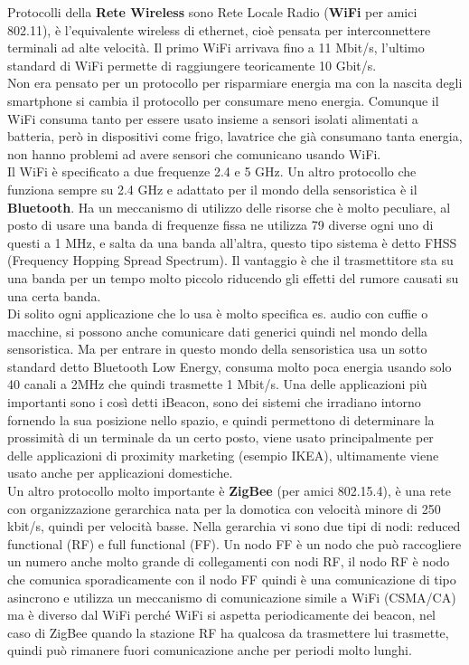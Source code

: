 \documentclass[11pt, twocolumn]{article}
\begin{document}
Protocolli della \textbf{Rete Wireless} sono Rete Locale Radio (\textbf{WiFi} per amici 802.11), è l'equivalente wireless di ethernet, cioè pensata per interconnettere terminali ad alte velocità.
Il primo WiFi arrivava fino a 11 Mbit/s, l'ultimo standard di WiFi permette di raggiungere teoricamente 10 Gbit/s.\\
Non era pensato per un protocollo per risparmiare energia ma con la nascita degli smartphone si cambia il protocollo per consumare meno energia.
Comunque il WiFi consuma tanto per essere usato insieme a sensori isolati alimentati a batteria, però in dispositivi come frigo, lavatrice che già consumano tanta energia, non hanno problemi ad avere sensori che comunicano usando WiFi.\\
Il WiFi è specificato a due frequenze 2.4 e 5 GHz.
Un altro protocollo che funziona sempre su 2.4 GHz e adattato per il mondo della sensoristica è il \textbf{Bluetooth}.
Ha un meccanismo di utilizzo delle risorse che è molto peculiare, al posto di usare una banda di frequenze fissa ne utilizza 79 diverse ogni uno di questi a 1 MHz, e salta da una banda all'altra, questo tipo sistema è detto FHSS (Frequency Hopping Spread Spectrum).
Il vantaggio è che il trasmettitore sta su una banda per un tempo molto piccolo riducendo gli effetti del rumore causati su una certa banda.\\
Di solito ogni applicazione che lo usa è molto specifica es. audio con cuffie o macchine, si possono anche comunicare dati generici quindi nel mondo della sensoristica.
Ma per entrare in questo mondo della sensoristica usa un sotto standard detto Bluetooth Low Energy, consuma molto poca energia usando solo 40 canali a 2MHz che quindi trasmette 1 Mbit/s.
Una delle applicazioni più importanti sono i così detti iBeacon, sono dei sistemi che irradiano intorno fornendo la sua posizione nello spazio, e quindi permettono di determinare la prossimità di un terminale da un certo posto, viene usato principalmente per delle applicazioni di proximity marketing (esempio IKEA), ultimamente viene usato anche per applicazioni domestiche.\\
Un altro protocollo molto importante è \textbf{ZigBee} (per amici 802.15.4), è una rete con organizzazione gerarchica nata per la domotica con velocità minore di 250 kbit/s, quindi per velocità basse.
Nella gerarchia vi sono due tipi di nodi: reduced functional (RF) e full functional (FF).
Un nodo FF è un nodo che può raccogliere un numero anche molto grande di collegamenti con nodi RF, il nodo RF è nodo che comunica sporadicamente con il nodo FF quindi è una comunicazione di tipo asincrono e utilizza un meccanismo di comunicazione simile a WiFi (CSMA/CA) ma è diverso dal WiFi perché WiFi si aspetta periodicamente dei beacon, nel caso di ZigBee quando la stazione RF ha qualcosa da trasmettere lui trasmette, quindi può rimanere fuori comunicazione anche per periodi molto lunghi.
\end{document}

